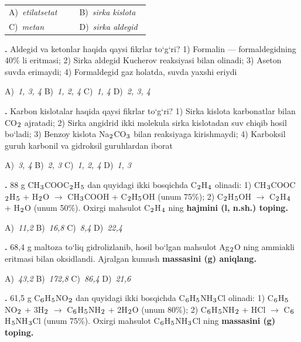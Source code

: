\documentclass[11pt,a4paper]{article}
\renewcommand{\textsubscript}[1]{\ensuremath{_{\text{\fontsize{8}{8}\selectfont #1}}}}
\newcommand{\qn}[1]{\textbf{\fontsize{11.5}{13}\selectfont #1}}
\newcommand{\qsep}{\par\vspace{1pt}\noindent\rule{0pt}{0.4pt}\par\vspace{5pt}}
\begin{document}
\begin{multicols}{2}
\noindent\begin{tabular}{@{}p{0.47\linewidth}@{}p{0.47\linewidth}@{}}
A)~\textsl{etilatsetat} & B)~\textsl{sirka kislota} \\
C)~\textsl{metan} & D)~\textsl{sirka aldegid} \\
\end{tabular}\par
\qsep
\noindent\qn{24.} Aldegid va ketonlar haqida qaysi fikrlar to`g`ri? 1) Formalin --- formaldegidning 40\% li eritmasi; 2) Sirka aldegid Kucherov reaksiyasi bilan olinadi; 3) Aseton suvda erimaydi; 4) Formaldegid gaz holatda, suvda yaxshi eriydi

\noindent A)~\textsl{1, 3, 4} \hfill B)~\textsl{1, 2, 4} \hfill C)~\textsl{1, 4} \hfill D)~\textsl{2, 3, 4}\par
\qsep
\noindent\qn{25.} Karbon kislotalar haqida qaysi fikrlar to`g`ri? 1) Sirka kislota karbonatlar bilan CO\textsubscript{2} ajratadi; 2) Sirka angidrid ikki molekula sirka kislotadan suv chiqib hosil bo`ladi; 3) Benzoy kislota Na\textsubscript{2}CO\textsubscript{3} bilan reaksiyaga kirishmaydi; 4) Karboksil guruh karbonil va gidroksil guruhlardan iborat

\noindent A)~\textsl{3, 4} \hfill B)~\textsl{2, 3} \hfill C)~\textsl{1, 2, 4} \hfill D)~\textsl{1, 3}\par
\qsep
\noindent\qn{26.} 88 g CH\textsubscript{3}COOC\textsubscript{2}H\textsubscript{5} dan quyidagi ikki bosqichda C\textsubscript{2}H\textsubscript{4} olinadi: 1) CH\textsubscript{3}COOC\textsubscript{2}H\textsubscript{5} + H\textsubscript{2}O $\to$ CH\textsubscript{3}COOH + C\textsubscript{2}H\textsubscript{5}OH (unum 75\%); 2) C\textsubscript{2}H\textsubscript{5}OH $\to$ C\textsubscript{2}H\textsubscript{4} + H\textsubscript{2}O (unum 50\%). Oxirgi mahsulot C\textsubscript{2}H\textsubscript{4} ning \textbf{hajmini (l, n.sh.) toping.}

\noindent A)~\textsl{11,2} \hfill B)~\textsl{16,8} \hfill C)~\textsl{8,4} \hfill D)~\textsl{22,4}\par
\qsep
\noindent\qn{27.} 68,4 g maltoza to`liq gidrolizlanib, hosil bo`lgan mahsulot Ag\textsubscript{2}O ning ammiakli eritmasi bilan oksidlandi. Ajralgan kumush \textbf{massasini (g) aniqlang.}

\noindent A)~\textsl{43,2} \hfill B)~\textsl{172,8} \hfill C)~\textsl{86,4} \hfill D)~\textsl{21,6}\par
\qsep
\noindent\qn{28.} 61,5 g C\textsubscript{6}H\textsubscript{5}NO\textsubscript{2} dan quyidagi ikki bosqichda C\textsubscript{6}H\textsubscript{5}NH\textsubscript{3}Cl olinadi: 1) C\textsubscript{6}H\textsubscript{5}NO\textsubscript{2} + 3H\textsubscript{2} $\to$ C\textsubscript{6}H\textsubscript{5}NH\textsubscript{2} + 2H\textsubscript{2}O (unum 80\%); 2) C\textsubscript{6}H\textsubscript{5}NH\textsubscript{2} + HCl $\to$ C\textsubscript{6}H\textsubscript{5}NH\textsubscript{3}Cl (unum 75\%). Oxirgi mahsulot C\textsubscript{6}H\textsubscript{5}NH\textsubscript{3}Cl ning \textbf{massasini (g) toping.}


\end{multicols}
\end{document}

